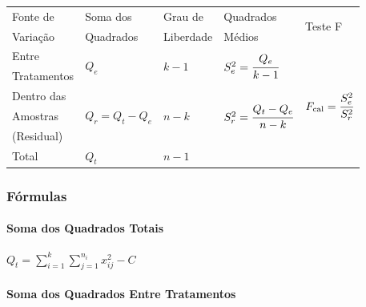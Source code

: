 			\begin{table}[H]

				\centering
		
				\begin{tabularx}{\textwidth}{X <{\centering} X <{\centering} X <{\centering} X <{\centering} X <{\centering}}
			
					Fonte de & Soma dos & Grau de & Quadrados & \multirow{2}{*}{Teste F} \\
				Variação & Quadrados & Liberdade & Médios \\
				
					\noalign{\smallskip} \hline \noalign{\smallskip}
				
					Entre & \multirow{2}{*}{$ Q_{e} $} & \multirow{2}{*}{$ k -1 $} & \multirow{2}{*}{$ S^{2}_{e} = \cfrac{Q_{e}}{k - 1} $} & \multirow{7}{*}{$ F_{\text{cal}} = \cfrac{S^{2}_{e}}{S^{2}_{r}} $} \\
					Tratamentos & & & & \\
				
					\noalign{\smallskip} \cline{1-4} \noalign{\smallskip}
				
					Dentro das & \multirow{3}{*}{$ Q_{r} = Q_{t} - Q_{e} $} & \multirow{3}{*}{$ n - k $} & \multirow{3}{*}{$ S^{2}_{r} = \cfrac{Q_{t} - Q_{e}}{n - k} $} & \\
					Amostras & & & & \\
					(Residual) & & & & \\
				
					\noalign{\smallskip} \cline{1-4} \noalign{\smallskip}
				
					Total & $ Q_{t} $ & $ n - 1 $ & &
				
				\end{tabularx}

			\end{table}

		\subsubsection{Fórmulas}
	
			\paragraph{Soma dos Quadrados Totais}
		
				{\Large $ Q_{t} = \sum \limits^{k}_{i=1} \sum \limits^{n_{i}}_{j=1} x^{2}_{ij} - C$}
			
			\paragraph{Soma dos Quadrados Entre Tratamentos}
		
